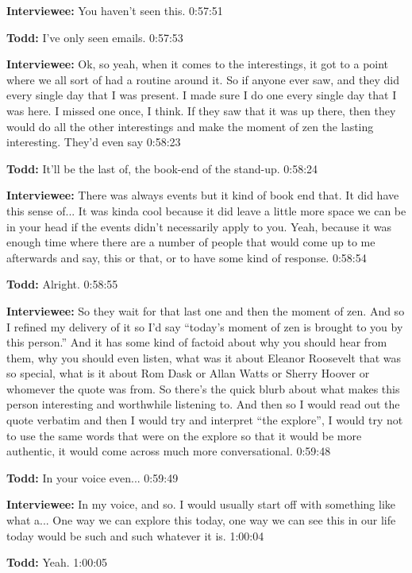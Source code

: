 \textbf{Interviewee:}  	You haven't seen this.  0:57:51

\textbf{Todd:}  	I've only seen emails.   0:57:53

\textbf{Interviewee:}	Ok, so yeah, when it comes to the interestings, it got to a point where we all sort of had a routine around it.  So if anyone ever saw, and they did every single day that I was present.  I made sure I do one every single day that I was here.  I missed one once, I think. If they saw that it was up there, then they would do all the other interestings and make the moment of zen the lasting interesting.  They'd even say  0:58:23

\textbf{Todd:}  	It'll be the last of, the book-end of the stand-up.  0:58:24

\textbf{Interviewee:} 	There was always events but it kind of book end that.  It did have this sense of...  It was kinda cool because it did leave a little more space we can be in your head if the events didn't necessarily apply to you.  Yeah, because it was enough time where there are a number of people that would come up to me afterwards and say, this or that, or to have some kind of response.  0:58:54

\textbf{Todd:}  	Alright.  0:58:55

\textbf{Interviewee:}  	So they wait for that last one and then the moment of zen.  And so I refined my delivery of it so I'd say “today's moment of zen is brought to you by this person.”  And it has some kind of factoid about why you should hear from them, why you should even listen, what was it about Eleanor Roosevelt that was so special, what is it about Rom Dask or Allan Watts or Sherry Hoover or whomever the quote was from. So there's the quick blurb about what makes this person interesting and worthwhile listening to.  And then so I would read out the quote verbatim and then I would try and interpret “the explore”, I would try not to use the same words that were on the explore so that it would be more authentic, it would come across much more conversational.  0:59:48

\textbf{Todd:}  	In your voice even... 0:59:49

\textbf{Interviewee:}  	In my voice, and so.  I would usually start off with something like what a...  One way we can explore this today, one way we can see this in our life today would be such and such whatever it is.  1:00:04

\textbf{Todd:}  	Yeah.  1:00:05

